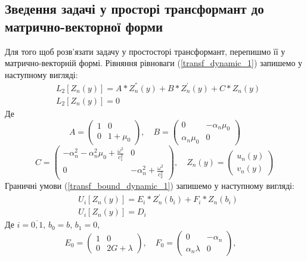 \subsection{Зведення задачі у просторі трансформант до матрично-векторної форми}
Для того щоб розв'язати задачу у простосторі трансформант, перепишмо її у матрично-векторній формі.
Рівняння рівноваги (\ref{transf_dynamic_1}) запишемо у наступному вигляді:
\begin{align}\label{transf_mat_dynamic_1}
    &L_2\left[ Z_n(y) \right] = A * Z_n^{''}(y) + B * Z_n^{'}(y) + C * Z_n(y) \nonumber \\
    &L_2\left[ Z_n(y) \right] = 0
\end{align}
Де
\begin{equation*}
    A = \begin{pmatrix}
        1 & 0 \\
        0 & 1 + \mu_0
    \end{pmatrix}, \quad
    B = \begin{pmatrix}
        0 & -\alpha_n \mu_0 \\
        \alpha_n \mu_0 & 0
    \end{pmatrix}
\end{equation*}
\begin{equation*}
    C = \begin{pmatrix}
        -\alpha_n^2 -\alpha_n^2 \mu_0 + \frac{\omega^2}{c_1^2} & 0 \\
        0 & -\alpha_n^2 + \frac{\omega^2}{c_2^2}
    \end{pmatrix}, \quad
    Z_n(y) = \begin{pmatrix}
        u_n(y) \\
        v_n(y)
    \end{pmatrix}
\end{equation*}
Граничні умови (\ref{transf_bound_dynamic_1}) запишемо у наступному вигляді:
\begin{align}\label{transf_bound_mat_dynamic_1}
    &U_i\left[ Z_n(y) \right] = E_i * Z_n^{'}(b_i) + F_i * Z_n(b_i) \nonumber \\
    & U_i\left[ Z_n(y) \right] = D_i
\end{align}
Де $i = \overline{0, 1}$, $b_0 = b$, $b_1 = 0$,
\begin{equation*}
    E_0 = \begin{pmatrix}
        1 & 0 \\
        0 & 2G + \lambda
    \end{pmatrix}, \quad
    F_0 = \begin{pmatrix}
        0 & -\alpha_n \\
        \alpha_n \lambda & 0
    \end{pmatrix}, \quad
\end{equation*}
